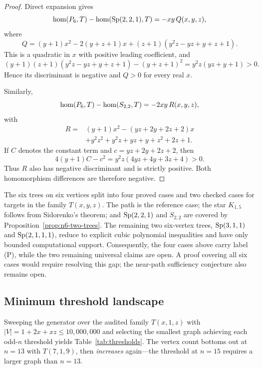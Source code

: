 \begin{proof}
  Direct expansion gives
  \[
  \mathrm{hom}(P_6,T)-\mathrm{hom}(\operatorname{Sp}(2,2,1),T)=-xy\,Q(x,y,z),
  \]
  where
  \[
  Q=(y+1)x^2-2(y+z+1)x
    +(z+1)(y^2z-yz+y+z+1).
  \]
  This is a quadratic in $x$ with positive leading coefficient, and
  \[
  (y+1)(z+1)(y^2z-yz+y+z+1)-(y+z+1)^2
    =y^2z(yz+y+1)>0.
  \]
  Hence its discriminant is negative and $Q>0$ for every real $x$.

  Similarly,
  \[
  \mathrm{hom}(P_6,T)-\mathrm{hom}(S_{2,2},T)=-2xy\,R(x,y,z),
  \]
  with
  \begin{align*}
  R={}&(y+1)x^2-(yz+2y+2z+2)x\\
     &+y^2z^2+y^2z+yz+y+z^2+2z+1.
  \end{align*}
  If $C$ denotes the constant term and $c=yz+2y+2z+2$, then
  \[
    4(y+1)C-c^2=y^2z(4yz+4y+3z+4)>0.
  \]
  Thus $R$ also has negative discriminant and is strictly positive.
  Both homomorphism differences are therefore negative.
\end{proof}

\begin{remark}[The remaining $n=6$ cases]
  \label{rem:n6_residue}
  The six trees on six vertices split into four proved cases and two
  checked cases for targets in the family $T(x,y,z)$. The path is the
  reference case; the star $K_{1,5}$ follows from Sidorenko's theorem;
  and $\operatorname{Sp}(2,2,1)$ and $S_{2,2}$ are covered by
  Proposition~\ref{prop:n6-two-trees}.
  The remaining two six-vertex trees, $\operatorname{Sp}(3,1,1)$ and
  $\operatorname{Sp}(2,1,1,1)$, reduce to explicit cubic polynomial inequalities and
  have only bounded computational support. Consequently, the four cases
  above carry label (P), while the two remaining universal claims are open.
  A proof covering all six cases would require resolving this gap; the
  near-path sufficiency conjecture also remains open.
\end{remark}

\subsection{Minimum threshold landscape}

Sweeping the generator over the audited family $T(x,1,z)$ with
$|V| = 1 + 2x + xz \le 10{,}000{,}000$ and
selecting the smallest graph achieving each odd-$n$ threshold yields
Table~\ref{tab:thresholds}. The vertex count bottoms out at $n = 13$
with $T(7,1,9)$, then \emph{increases} again---the threshold at $n = 15$
requires a larger graph than $n = 13$.

